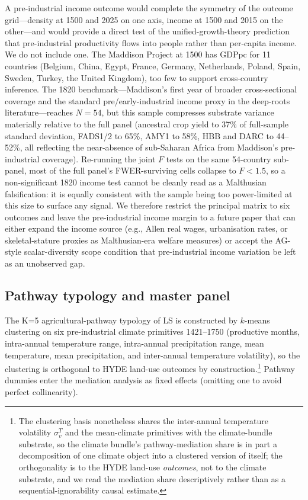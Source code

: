 \documentclass[11pt,letterpaper]{article}
\begin{document}
A pre-industrial income outcome would complete the symmetry of the outcome grid---density at 1500 and 2025 on one axis, income at 1500 and 2015 on the other---and would provide a direct test of the unified-growth-theory prediction that pre-industrial productivity flows into people rather than per-capita income. We do not include one. The Maddison Project at 1500 has GDPpc for 11 countries (Belgium, China, Egypt, France, Germany, Netherlands, Poland, Spain, Sweden, Turkey, the United Kingdom), too few to support cross-country inference. The 1820 benchmark---Maddison's first year of broader cross-sectional coverage and the standard pre/early-industrial income proxy in the deep-roots literature---reaches $N=54$, but this sample compresses substrate variance materially relative to the full panel (ancestral crop yield to 37\% of full-sample standard deviation, FADS1/2 to 65\%, AMY1 to 58\%, HBB and DARC to 44--52\%, all reflecting the near-absence of sub-Saharan Africa from Maddison's pre-industrial coverage). Re-running the joint $F$ tests on the same 54-country sub-panel, most of the full panel's FWER-surviving cells collapse to $F<1.5$, so a non-significant 1820 income test cannot be cleanly read as a Malthusian falsification: it is equally consistent with the sample being too power-limited at this size to surface any signal. We therefore restrict the principal matrix to six outcomes and leave the pre-industrial income margin to a future paper that can either expand the income source (e.g., Allen real wages, urbanisation rates, or skeletal-stature proxies as Malthusian-era welfare measures) or accept the AG-style scalar-diversity scope condition that pre-industrial income variation be left as an unobserved gap.

\subsection{Pathway typology and master panel}
\label{sec:data-pathways}

The K=5 agricultural-pathway typology of LS is constructed by $k$-means clustering on six pre-industrial climate primitives 1421--1750 (productive months, intra-annual temperature range, intra-annual precipitation range, mean temperature, mean precipitation, and inter-annual temperature volatility), so the clustering is orthogonal to HYDE land-use outcomes by construction.\footnote{The clustering basis nonetheless shares the inter-annual temperature volatility $\sigma_v^T$ and the mean-climate primitives with the climate-bundle substrate, so the climate bundle's pathway-mediation share is in part a decomposition of one climate object into a clustered version of itself; the orthogonality is to the HYDE land-use \emph{outcomes}, not to the climate substrate, and we read the mediation share descriptively rather than as a sequential-ignorability causal estimate.} Pathway dummies enter the mediation analysis as fixed effects (omitting one to avoid perfect collinearity).
\end{document}
